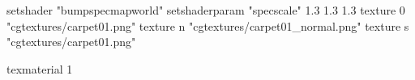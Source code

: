 setshader "bumpspecmapworld"
setshaderparam "specscale" 1.3 1.3 1.3
   texture 0 "cgtextures/carpet01.png"
   texture n "cgtextures/carpet01_normal.png"
   texture s "cgtextures/carpet01.png"

texmaterial 1
